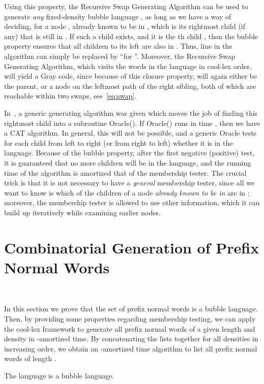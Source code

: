 \documentclass[11pt,a4paper]{llncs}
\begin{document}
Using this property, the Recursive Swap Generating Algorithm can be used to generate {\em any} fixed-density bubble language , as long as we have a way of deciding, for a node , already known to be in , which is its rightmost child (if any) that is still in . If such a child exists, and it is the th child , then the bubble property ensures that all children to its left are also in . Thus, line  in the algorithm can simply be replaced by ``for ''. Moreover, the Recursive Swap Generating Algorithm, which visits the words in the language in cool-lex order, will yield a Gray code, since because of this closure property,  will again either be the parent, or a node on the leftmost path of the right sibling, both of which are reachable within two swaps, see~\eqref{eq:swap}.

In~\cite{SW12}, a generic generating algorithm was given which moves the job of finding this rightmost child  into a subroutine Oracle(). If Oracle() runs in time , then we have a CAT algorithm. In general, this will not be possible, and a generic Oracle  tests for each child from left to right (or from right to left) whether it is in the language. Because of the bubble property, after the first negative (positive) test, it is guaranteed that no more children will be in the language, and the running time of the algorithm is amortized that of the membership tester. The crucial trick is  that it is not necessary to have a {\em general} membership tester, since all we want to know is which of the children of a node {\em already known to be in } are in ; moreover, the membership tester is allowed to use other information, which it can build up iteratively while examining earlier nodes.

\section{Combinatorial Generation of Prefix Normal Words}~\label{sec:combgenpnw}


In this section we prove that the set of prefix normal words  is a bubble language.  Then, by providing some properties regarding membership testing, we can apply the cool-lex framework to generate all prefix normal words of a given length  and density  in -amortized time.  By concatenating the lists together for all densities in increasing order, we obtain an -amortized time algorithm to list all prefix normal words of length .

\begin{lemma}
\label{lemma:PNbubble}
 The language  is a bubble language.
\end{lemma}
\end{document}
